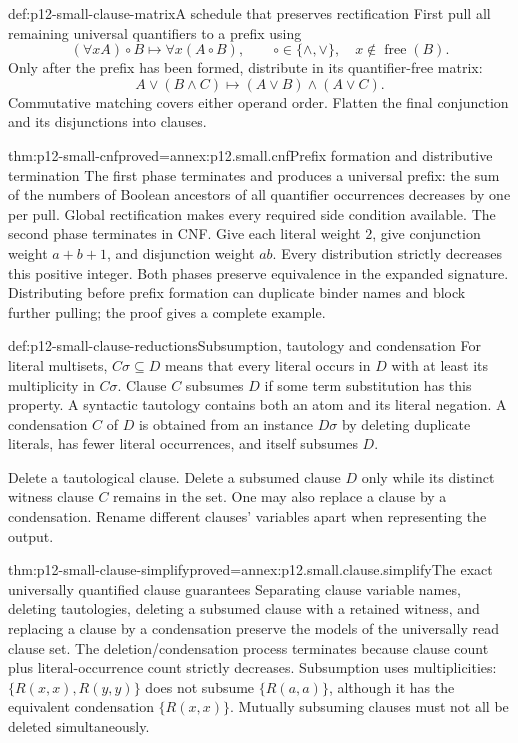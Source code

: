 \begin{hbmethod}{def:p12-small-clause-matrix}{A schedule that preserves rectification}
First pull all remaining universal quantifiers to a prefix using
\[
          (\forall x A)\circ B\longmapsto\forall x(A\circ B),
       \qquad \circ\in\{\land,\lor\},\quad
                    x\notin\operatorname{free}(B).
\]
Only after the prefix has been formed, distribute in its
quantifier-free matrix:
\[
                 A\lor(B\land C)
                 \longmapsto(A\lor B)\land(A\lor C).
\]
Commutative matching covers either operand order.
Flatten the final conjunction and its disjunctions into clauses.
\end{hbmethod}

\begin{hbtheorem}{thm:p12-small-cnf}{proved=annex:p12.small.cnf}{Prefix formation and distributive termination}
The first phase terminates and produces a universal prefix:
the sum of the numbers of Boolean ancestors of all quantifier
occurrences decreases by one per pull.
Global rectification makes every required side condition available.
The second phase terminates in CNF. Give each literal weight \(2\),
give conjunction weight \(a+b+1\), and disjunction weight \(ab\).
Every distribution strictly decreases this positive integer.
Both phases preserve equivalence in the expanded signature.
Distributing before prefix formation can duplicate binder names
and block further pulling; the proof gives a complete example.
\end{hbtheorem}

\begin{hbdefinition}{def:p12-small-clause-reductions}{Subsumption, tautology and condensation}
For literal multisets, \(C\sigma\subseteq D\) means that every
literal occurs in \(D\) with at least its multiplicity in \(C\sigma\).
Clause \(C\) subsumes \(D\) if some term substitution has this property.
A syntactic tautology contains both an atom and its literal negation.
A condensation \(C\) of \(D\) is obtained from an instance \(D\sigma\)
by deleting duplicate literals, has fewer literal occurrences,
and itself subsumes \(D\).

Delete a tautological clause. Delete a subsumed clause \(D\) only
while its distinct witness clause \(C\) remains in the set.
One may also replace a clause by a condensation.
Rename different clauses' variables apart when representing the output.
\end{hbdefinition}

\begin{hbtheorem}{thm:p12-small-clause-simplify}{proved=annex:p12.small.clause.simplify}{The exact universally quantified clause guarantees}
Separating clause variable names, deleting tautologies, deleting a
subsumed clause with a retained witness, and replacing a clause by
a condensation preserve the models of the universally read clause set.
The deletion/condensation process terminates because clause count
plus literal-occurrence count strictly decreases.
Subsumption uses multiplicities: \(\{R(x,x),R(y,y)\}\)
does not subsume \(\{R(a,a)\}\), although it has the
equivalent condensation \(\{R(x,x)\}\).
Mutually subsuming clauses must not all be deleted simultaneously.
\end{hbtheorem}

